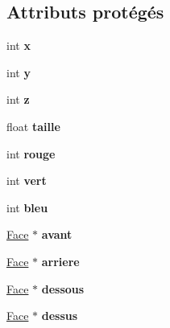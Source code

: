 \subsection*{Attributs protégés}
\begin{DoxyCompactItemize}
\item 
\hypertarget{classCube_aa4f56a40ada8a030ac48d775d2ac6ad1}{int {\bfseries x}}\label{classCube_aa4f56a40ada8a030ac48d775d2ac6ad1}

\item 
\hypertarget{classCube_a0d4c859ce871ed5eb4d02a83823a77f9}{int {\bfseries y}}\label{classCube_a0d4c859ce871ed5eb4d02a83823a77f9}

\item 
\hypertarget{classCube_a181171a5a8434e8eef79b3308ae08e03}{int {\bfseries z}}\label{classCube_a181171a5a8434e8eef79b3308ae08e03}

\item 
\hypertarget{classCube_a70f3132d99958062f45499c5453fd959}{float {\bfseries taille}}\label{classCube_a70f3132d99958062f45499c5453fd959}

\item 
\hypertarget{classCube_a174baf27071a6f70d5f12ab798ed186c}{int {\bfseries rouge}}\label{classCube_a174baf27071a6f70d5f12ab798ed186c}

\item 
\hypertarget{classCube_aa99801491d1f8e7b220465e4e9d54c0f}{int {\bfseries vert}}\label{classCube_aa99801491d1f8e7b220465e4e9d54c0f}

\item 
\hypertarget{classCube_ab7d03764d207dc8c29e4a4b99109063c}{int {\bfseries bleu}}\label{classCube_ab7d03764d207dc8c29e4a4b99109063c}

\item 
\hypertarget{classCube_adceb9f70f2cc8322ecf49342f514cc75}{\hyperlink{classFace}{Face} $\ast$ {\bfseries avant}}\label{classCube_adceb9f70f2cc8322ecf49342f514cc75}

\item 
\hypertarget{classCube_aab5a1291adfb387abd49893dd9a7097f}{\hyperlink{classFace}{Face} $\ast$ {\bfseries arriere}}\label{classCube_aab5a1291adfb387abd49893dd9a7097f}

\item 
\hypertarget{classCube_a112099089b84e89f60d77740fe7c5120}{\hyperlink{classFace}{Face} $\ast$ {\bfseries dessous}}\label{classCube_a112099089b84e89f60d77740fe7c5120}

\item 
\hypertarget{classCube_a39e112f9a2d9c9ead7d9493624733784}{\hyperlink{classFace}{Face} $\ast$ {\bfseries dessus}}\label{classCube_a39e112f9a2d9c9ead7d9493624733784}


\end{DoxyCompactItemize}
